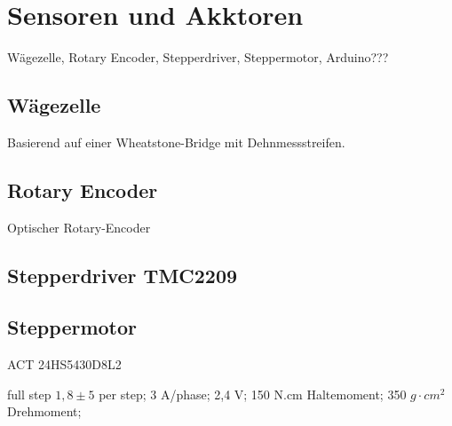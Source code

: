 \section{Sensoren und Akktoren}
\label{sec:Sensoren_Akktoren}

Wägezelle, Rotary Encoder, Stepperdriver, Steppermotor, Arduino???

\subsection{Wägezelle}
\label{subsec:sensor_waegezelle}

Basierend auf einer Wheatstone-Bridge mit Dehnmessstreifen.
\subsection{Rotary Encoder}
\label{subsec:sensor_rotary-encoder}

Optischer Rotary-Encoder
\subsection{Stepperdriver TMC2209}
\label{subsec:sensor_driver}


\subsection{Steppermotor}
\label{subsec:sensor_motor}

ACT 24HS5430D8L2

full step $1,8 \pm 5$ per step;
3 A/phase;
2,4 V;
150 N.cm Haltemoment;
350 $g \cdot cm^2$ Drehmoment;